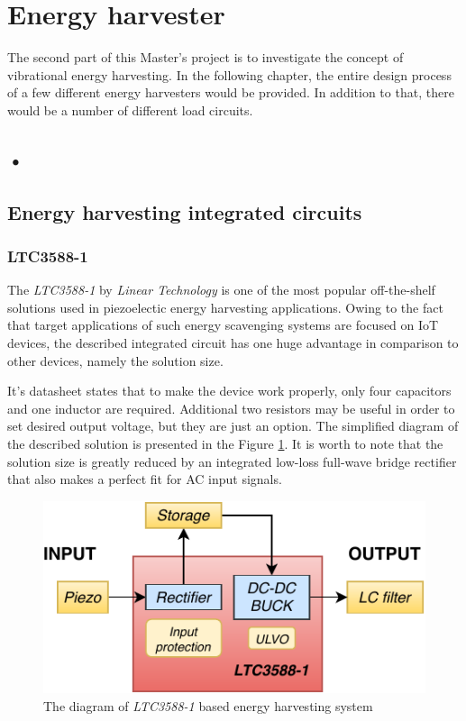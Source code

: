 \documentclass[12pt,a4paper]{article}
\begin{document}
\section{Energy harvester}
The second part of this Master's project is to investigate the concept of vibrational energy harvesting. In the following chapter, the entire design process of a few different energy harvesters would be provided. In addition to that, there would be a number of different load circuits.

\subsection{•}

\subsection{Energy harvesting integrated circuits}
\subsubsection{LTC3588-1}
The \textit{LTC3588-1} by \textit{Linear Technology} is one of the most popular off-the-shelf solutions used in piezoelectic energy harvesting applications. Owing to the fact that target applications of such energy scavenging systems are focused on IoT devices, the described integrated circuit has one huge advantage in comparison to other devices, namely the solution size.
\par
It's datasheet \cite{ltc3588_params} states that to make the device work properly, only four capacitors and one inductor are required. Additional two resistors may be useful in order to set desired output voltage, but they are just an option. The simplified diagram of the described solution is presented in the Figure \ref{fig:ltc3588diagram}. It is worth to note that the solution size is greatly reduced by an integrated low-loss full-wave bridge rectifier that also makes a perfect fit for AC input signals.

\begin{figure}[ht!]
\includegraphics[scale=1.2]{LTC3588.pdf}
\caption{The diagram of \textit{LTC3588-1} based energy harvesting system}
\label{fig:ltc3588diagram}
\end{figure}
\end{document}
